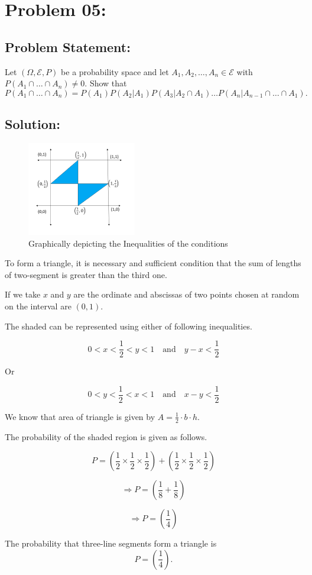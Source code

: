 \documentclass{article}
\theoremstyle{definition}
\begin{document}
\section{Problem 05:}
\begin{mdframed}[style = MyFrame]
\subsection{Problem Statement:}

   Let \((\Omega, \mathcal{E}, P)\) be a probability space and let \(A_1, A_2, \ldots, A_n \in \mathcal{E}\) with \(P(A_1 \cap \ldots \cap A_n) \neq 0\). Show that 
\[ P(A_1 \cap \ldots \cap A_n) = P(A_1)P(A_2|A_1)P(A_3|A_2\cap A_1)\ldots P(A_n|A_{n-1}\cap\ldots\cap A_1).  \]

\end{mdframed}
\subsection{Solution:}
\begin{figure}[h]
    \centering
    \includegraphics{sol5.png}
    \caption{Graphically depicting the Inequalities of the conditions}
    \label{fig:Illustration for sol 5}
\end{figure}

To form a triangle, it is necessary and sufficient condition that the sum of lengths of two-segment is greater than the third one.

If we take $x$ and $y$ are the ordinate and abscissas of two points chosen at random on the interval are $(0, 1)$.

The shaded can be represented using either of following inequalities.

\[ 0 < x < \frac{1}{2} < y < 1 \quad \text{and} \quad y - x < \frac{1}{2} \]

Or

\[ 0 < y < \frac{1}{2} < x < 1 \quad \text{and} \quad x - y < \frac{1}{2} \]

We know that area of triangle is given by $A = \frac{1}{2} \cdot b \cdot h$.

The probability of the shaded region is given as follows.

\[ P = \left( \frac{1}{2} \times \frac{1}{2} \times \frac{1}{2} \right) + \left( \frac{1}{2} \times \frac{1}{2} \times \frac{1}{2}   \right) \]

\[ \Rightarrow P =\left(   {\frac {1 } {8 }} + \frac{1}{8}   \right) \]



\[ \Rightarrow P= {\left(   {\frac {1 } {4 }}    \right)} \]


The probability that three-line segments form a triangle is
\[ P= {\left(   {\frac {   1 } {4 }}    \right)}. \]
\end{document}

